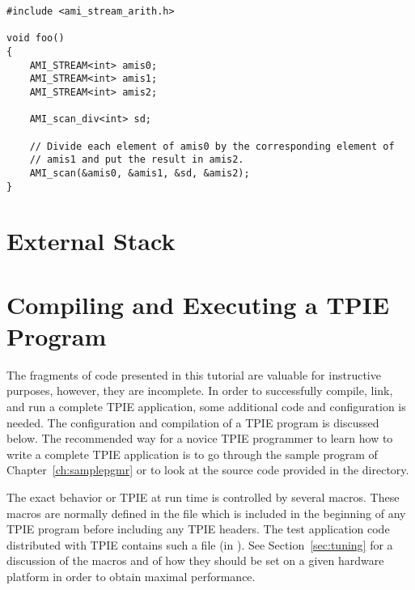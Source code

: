 \begin{verbatim}
#include <ami_stream_arith.h>

void foo()
{
    AMI_STREAM<int> amis0;
    AMI_STREAM<int> amis1;
    AMI_STREAM<int> amis2;

    AMI_scan_div<int> sd;

    // Divide each element of amis0 by the corresponding element of
    // amis1 and put the result in amis2.
    AMI_scan(&amis0, &amis1, &sd, &amis2);
}
\end{verbatim}



\section{External Stack}
\label{sec:stack}



\tobewritten

\section{Compiling and Executing a TPIE Program}
\label{sec:compiling}

The fragments of code presented in this tutorial are valuable for
instructive purposes, however, they are incomplete. In order to
successfully compile, link, and run a complete TPIE application, some
additional code and configuration is needed. The configuration and
compilation of a TPIE program is discussed below. The recommended way for a
novice TPIE programmer to learn how to write a complete TPIE application is
to go through the sample program of Chapter~\ref{ch:samplepgmr} or to look
at the source code provided in the  directory.

The exact behavior or TPIE at run time is controlled by several
macros. These macros are normally defined in the file 
 which is included in the beginning
of any TPIE program before including any TPIE headers. The test application
code distributed with TPIE contains such a file
(in ). See Section~\ref{sec:tuning} for a
discussion of the macros and of how they should be set on a given hardware
platform in order to obtain maximal performance.

